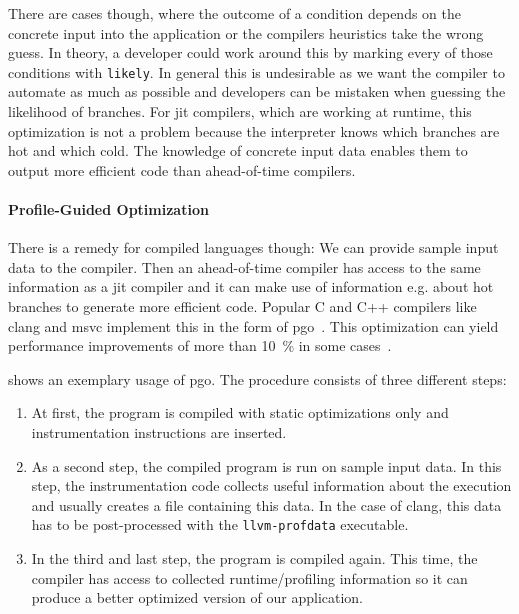 There are cases though, where the outcome of a condition depends on the concrete input into the application or the compilers heuristics take the wrong guess. In theory, a developer could work around this by marking every of those conditions with \texttt{likely}. In general this is undesirable as we want the compiler to automate as much as possible and developers can be mistaken when guessing the likelihood of branches.
For \gls{jit} compilers, which are working at runtime, this optimization is not a problem because the interpreter knows which branches are hot and which cold. The knowledge of concrete input data enables them to output more efficient code than ahead-of-time compilers.

\paragraph{Profile-Guided Optimization} There is a remedy for compiled languages though: We can provide sample input data to the compiler. Then an ahead-of-time compiler has access to the same information as a \gls{jit} compiler and it can make use of information e.g. about hot branches to generate more efficient code. Popular C and C++ compilers like clang and msvc implement this in the form of \gls{pgo}~\cite{ClangManual, MicrosoftPgo}. This optimization can yield performance improvements of more than \SI{10}{\percent} in some cases~\cite{LarabelPgo2018}.

 shows an exemplary usage of \gls{pgo}. The procedure consists of three different steps:
\begin{enumerate}
	\item At first, the program is compiled with static optimizations only and instrumentation instructions are inserted.
	\item As a second step, the compiled program is run on sample input data. In this step, the instrumentation code collects useful information about the execution and usually creates a file containing this data. In the case of clang, this data has to be post-processed with the \texttt{llvm-profdata} executable.
	\item In the third and last step, the program is compiled again. This time, the compiler has access to collected runtime/profiling information so it can produce a better optimized version of our application.
\end{enumerate}



